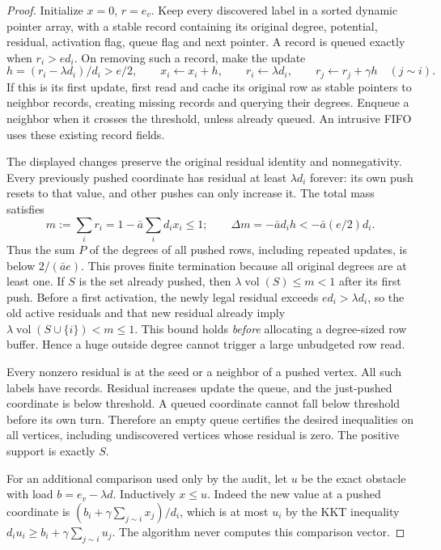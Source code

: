 \begin{proof}
Initialize $x=0$, $r=e_v$. Keep every discovered label in a sorted
dynamic pointer array, with a stable record containing its original degree,
potential, residual, activation flag, queue flag and next pointer. A record
is queued exactly when $r_i>e d_i$. On removing such a record, make the
update
\[
 h=(r_i-\lambda d_i)/d_i>e/2,\qquad
 x_i\gets x_i+h,\qquad r_i\gets\lambda d_i,\qquad
 r_j\gets r_j+\gamma h\quad(j\sim i).
\]
If this is its first update, first read and cache its original row as
stable pointers to neighbor records, creating missing records and querying
their degrees. Enqueue a neighbor when it crosses the threshold, unless
already queued. An intrusive FIFO uses these existing record fields.

The displayed changes preserve the original residual identity and
nonnegativity. Every previously pushed coordinate has residual at least
$\lambda d_i$ forever: its own push resets to that value, and other
pushes can only increase it. The total mass satisfies
\[
 m:=\sum_i r_i=1-\bar a\sum_i d_i x_i\leq1;
 \qquad \Delta m=-\bar a d_i h<-\bar a(e/2)d_i.
\]
Thus the sum $P$ of the degrees of all pushed rows, including repeated
updates, is below $2/(\bar a e)$. This proves finite termination because
all original degrees are at least one. If $S$ is the set already pushed,
then $\lambda\operatorname{vol}(S)\leq m<1$ after its first push.
Before a first activation, the newly legal residual exceeds
$e d_i>\lambda d_i$, so the old active residuals and that new residual
already imply $\lambda\operatorname{vol}(S\cup\{i\})<m\leq1$.
This bound holds \emph{before} allocating a degree-sized row buffer.
Hence a huge outside degree cannot trigger a large unbudgeted row read.

Every nonzero residual is at the seed or a neighbor of a pushed vertex.
All such labels have records. Residual increases update the queue, and
the just-pushed coordinate is below threshold. A queued coordinate cannot
fall below threshold before its own turn. Therefore an empty queue
certifies the desired inequalities on all vertices, including undiscovered
vertices whose residual is zero. The positive support is exactly $S$.

For an additional comparison used only by the audit, let $u$ be the
exact obstacle with load $b=e_v-\lambda d$. Inductively $x\leq u$.
Indeed the new value at a pushed coordinate is
$(b_i+\gamma\sum_{j\sim i}x_j)/d_i$, which is at most $u_i$ by
the KKT inequality $d_i u_i\geq b_i+\gamma\sum_{j\sim i}u_j$.
The algorithm never computes this comparison vector.


\end{proof}

